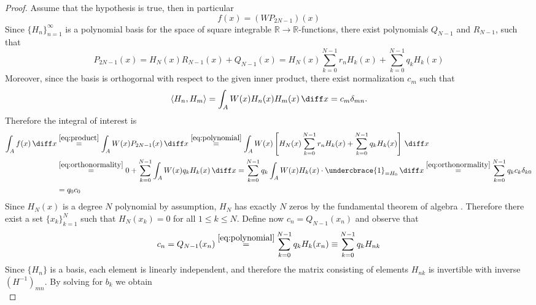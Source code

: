 \documentclass[11pt,english,a4paper]{article}
\begin{document}
\begin{proof}
Assume that the hypothesis is true, then in particular
\begin{equation}
f(x) = (WP_{2N-1})(x) \label{eq:product}
\end{equation}
Since $\{H_n\}_{n=1}^\infty$ is a polynomial basis for the space of square integrable $\mathbb{R} \to \mathbb{R}$-functions, there exist polynomials $Q_{N-1}$ and $R_{N-1}$, such that
\begin{equation}
P_{2N-1}(x) = H_N(x) R_{N-1} (x) + Q_{N-1}(x) = H_N(x) \sum_{k=0}^{N-1}r_nH_k(x) + \sum_{k=0}^{N - 1}q_k H_{k}(x) \label{eq:polynomial}
\end{equation}
Moreover, since the basis is orthogornal with respect to the given inner product, there exist normalization $c_{m}$ such that
\begin{equation}
\langle H_n,H_m\rangle = \int_A W(x) H_n(x) H_m(x)\, \diff x = c_{m}\delta_{mn}. \label{eq:orthonormality}
\end{equation}
Therefore the integral of interest is
\begin{align}
\int_A f(x) \,\diff x &\stackrel{\ref{eq:product}}{=} \int_A W(x)P_{2N-1}(x) \,\diff x \stackrel{\eqref{eq:polynomial}}{=} \int_A W(x)\left[ H_N(x) \sum_{k=0}^{N-1}r_nH_k(x) + \sum_{k=0}^{N - 1}q_k H_{k}(x) \right] \,\diff x \nonumber \\
&\stackrel{\eqref{eq:orthonormality}}{=} 0 + \sum_{k=0}^{N - 1}\int_A W(x) q_k H_{k}(x) \,\diff x = \sum_{k=0}^{N - 1} q_k \int_A W(x) H_{k}(x)\cdot\undercbrace{1}_{=H_0} \,\diff x \stackrel{\eqref{eq:orthonormality}}{=} \sum_{k=0}^{N - 1} q_kc_{k} \delta_{k0} \nonumber \\
&=q_0c_{0} \label{eq:coeff}
\end{align}
Since $H_N(x)$ is a degree $N$ polynomial by assumption, $H_N$ has exactly $N$ zeros by the fundamental theorem of algebra \parencite[12]{forster_lectures_1991}. Therefore there exist a set $\{x_k\}_{k=1}^N$ such that $H_N(x_k)=0$ for all $1 \leq k \leq N$. Define now $c_n = Q_{N-1}(x_n)$ and observe that
\begin{equation}
c_n = Q_{N-1}(x_n) \stackrel{\eqref{eq:polynomial}}{=} \sum_{k=0}^{N-1}q_k H_k(x_n) \equiv \sum_{k=0}^{N-1}q_k H_{nk} \label{eq:cn}
\end{equation}
Since $\{H_n\}$ is a basis, each element is linearly independent, and therefore the matrix consisting of elements $H_{nk}$ is invertible with inverse $(H^{-1})_{mn}$. By solving for $b_k$ we obtain
\begin{equation}

\end{equation}
\end{proof}
\end{document}
